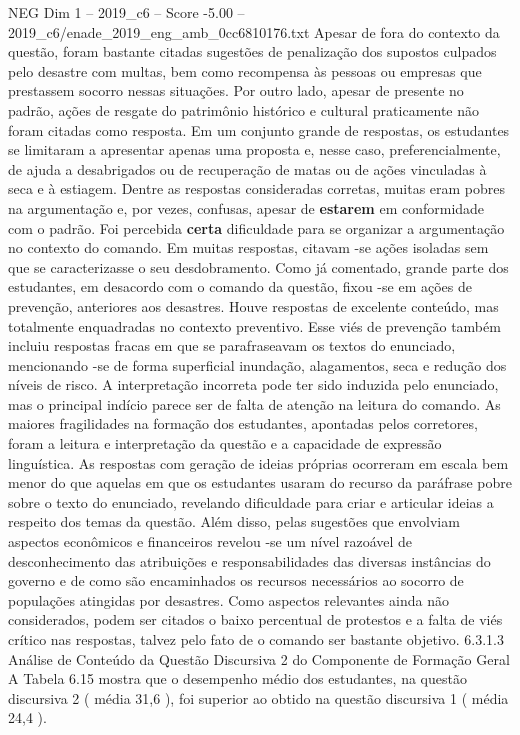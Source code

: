 \begin{textsample}{NEG Dim 1 – 2019\_c6 – Score -5.00 – 2019\_c6/enade\_2019\_eng\_amb\_0cc6810176.txt}
Apesar de fora do contexto da questão, foram bastante citadas sugestões de penalização dos supostos culpados pelo desastre com multas, bem como recompensa às pessoas ou empresas que prestassem socorro nessas situações.
Por outro lado, apesar de presente no padrão, ações de resgate do patrimônio histórico e cultural praticamente não foram citadas como resposta.
Em um conjunto grande de respostas, os estudantes se limitaram a apresentar apenas uma proposta e, nesse caso, preferencialmente, de ajuda a desabrigados ou de recuperação de matas ou de ações vinculadas à seca e à estiagem.
Dentre as respostas consideradas corretas, muitas eram pobres na argumentação e, por vezes, confusas, apesar de \textbf{estarem} em conformidade com o padrão.
Foi percebida \textbf{certa} dificuldade para se organizar a argumentação no contexto do comando.
Em muitas respostas, citavam -se ações isoladas sem que se caracterizasse o seu desdobramento.
Como já comentado, grande parte dos estudantes, em desacordo com o comando da questão, fixou -se em ações de prevenção, anteriores aos desastres.
Houve respostas de excelente conteúdo, mas totalmente enquadradas no contexto preventivo.
Esse viés de prevenção também incluiu respostas fracas em que se parafraseavam os textos do enunciado, mencionando -se de forma superficial inundação, alagamentos, seca e redução dos níveis de risco.
A interpretação incorreta pode ter sido induzida pelo enunciado, mas o principal indício parece ser de falta de atenção na leitura do comando.
As maiores fragilidades na formação dos estudantes, apontadas pelos corretores, foram a leitura e interpretação da questão e a capacidade de expressão linguística.
As respostas com geração de ideias próprias ocorreram em escala bem menor do que aquelas em que os estudantes usaram do recurso da paráfrase pobre sobre o texto do enunciado, revelando dificuldade para criar e articular ideias a respeito dos temas da questão.
Além disso, pelas sugestões que envolviam aspectos econômicos e financeiros revelou -se um nível razoável de desconhecimento das atribuições e responsabilidades das diversas instâncias do governo e de como são encaminhados os recursos necessários ao socorro de populações atingidas por desastres.
Como aspectos relevantes ainda não considerados, podem ser citados o baixo percentual de protestos e a falta de viés crítico nas respostas, talvez pelo fato de o comando ser bastante objetivo. 6.3.1.3 Análise de Conteúdo da Questão Discursiva 2 do Componente de Formação Geral A Tabela 6.15 mostra que o desempenho médio dos estudantes, na questão discursiva 2 ( média 31,6 ), foi superior ao obtido na questão discursiva 1 ( média 24,4 ).

\end{textsample}
